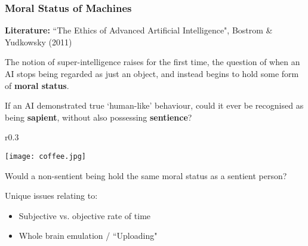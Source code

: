 \documentclass[10pt, compress]{beamer}
\begin{document}
\begin{frame}[fragile]
  \frametitle{Moral Status of Machines}
  
   \small{ 
   
   \textbf{Literature:} ``The Ethics of Advanced Artificial Intelligence", Bostrom \& Yudkowsky (2011)
   
   \vspace{10pt}
   
     The notion of super-intelligence raises for the first time, the question of when an AI stops being regarded as just an object, and instead begins to hold some form of \textbf{moral status}. 

	 If an AI demonstrated true `human-like' behaviour, could it ever be recognised as being \textbf{sapient}, without also possessing \textbf{sentience}?
	 
	 	            		       \begin{wrapfigure}{r}{0.3\textwidth}
  \begin{center}
    \texttt{[image: coffee.jpg]}
    \vspace{-20pt}
  \end{center}
  \end{wrapfigure}
	 
	 Would a non-sentient being hold the same moral status as a sentient person? 
	 
	 Unique issues relating to:
	 
	\begin{itemize}
   	\item Subjective vs. objective rate of time
   	\item Whole brain emulation / ``Uploading"
   \end{itemize}
	 
     }

\end{frame}

\end{document}
